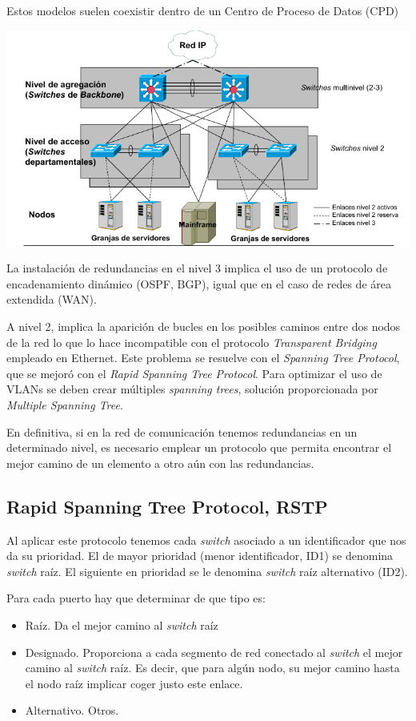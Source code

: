 Estos modelos suelen coexistir dentro de un Centro de Proceso de Datos (CPD)
\begin{center}
\includegraphics[width=\linewidth]{img/niveles.png}
\end{center}

La instalación de redundancias en el nivel 3 implica el uso de un protocolo de encadenamiento dinámico (OSPF, BGP), igual que en el caso de redes de área extendida (WAN).

A nivel 2, implica la aparición de bucles en los posibles caminos entre dos nodos de la red lo que lo hace incompatible con el protocolo \textit{Transparent Bridging} empleado en Ethernet. Este problema se resuelve con el \textit{Spanning Tree Protocol}, que se mejoró con el \textit{Rapid Spanning Tree Protocol}. Para optimizar el uso de VLANs se deben crear múltiples \textit{spanning trees}, solución proporcionada por \textit{Multiple Spanning Tree}.

En definitiva, si en la red de comunicación tenemos redundancias en un determinado nivel, es necesario emplear un protocolo que permita encontrar el mejor camino de un elemento a otro aún con las redundancias.

\subsection{Rapid Spanning Tree Protocol, RSTP}

Al aplicar este protocolo tenemos cada \textit{switch} asociado a un identificador que nos da su prioridad. El de mayor prioridad (menor identificador, ID1) se denomina \textit{switch} raíz. El siguiente en prioridad se le denomina \textit{switch} raíz alternativo (ID2).

Para cada puerto hay que determinar de que tipo es:
\begin{itemize}
\item Raíz. Da el mejor camino al \textit{switch} raíz

\item Designado. Proporciona a cada segmento de red conectado al \textit{switch} el mejor camino al \textit{switch} raíz. Es decir, que para algún nodo, su mejor camino hasta el nodo raíz implicar coger justo este enlace.

\item Alternativo. Otros.
\end{itemize}

